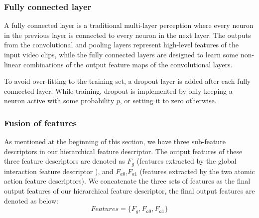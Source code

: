 \subsubsection*{Fully connected layer}
\label{fc}
A fully connected layer is a traditional multi-layer perception where every neuron in the previous layer is connected to every neuron in the next layer. The outputs from the convolutional and pooling layers represent high-level features of the input video clips, while the fully connected layers are designed to learn some non-linear combinations of the output feature maps of the convolutional layers.
\par
\label{dropout}
To avoid over-fitting to the training set, a dropout layer \cite{dropout} is added after each fully connected layer. While training, dropout is implemented by only keeping a neuron active with some probability \(p\), or setting it to zero otherwise. 

\subsubsection*{Fusion of features}
As mentioned at the beginning of this section, we have three sub-feature descriptors in our hierarchical feature descriptor. The output features of these three feature descriptors are denoted as \(F_g\) (features extracted by the global interaction feature descriptor ), and \(F_{a0}\),\(F_{a1}\) (features extracted by the two atomic action feature descriptors).  We concatenate the three sets of features as the final output features of our hierarchical feature descriptor, the final output features are denoted as below:
\begin{equation}
 	Features = \{F_{g}, F_{a0}, F_{a1}\}
\end{equation}  

